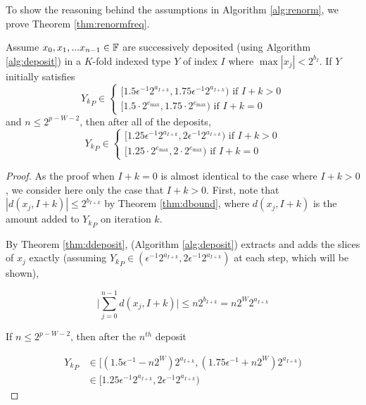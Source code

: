     To show the reasoning behind the assumptions in Algorithm \ref{alg:renorm},
    we prove Theorem \ref{thm:renormfreq}.

      \begin{samepage}
    \begin{thm}
      Assume $x_0, x_1, ... x_{n - 1} \in \mathbb{F}$ are successively deposited (using Algorithm \ref{alg:deposit}) in a $K$-fold indexed type $Y$ of index $I$ where $\max|x_j| < 2^{b_I}$. If $Y$ initially satisfies
       \[
      {Y_k}_P \in \begin{cases}[1.5  \epsilon^{-1} 2^{a_{I + k}}, 1.75  \epsilon^{-1} 2^{a_{I + k}}) \text{ if } I + k > 0 \\ [1.5 \cdot 2^{e_{\max}}, 1.75 \cdot 2^{e_{\max}}) \text{ if } I + k = 0\end{cases}
      \]
       and $n \leq 2^{p - W - 2}$, then after all of the deposits, 
       \[
      {Y_k}_P \in \begin{cases}[1.25  \epsilon^{-1} 2^{a_{I + k}}, 2  \epsilon^{-1} 2^{a_{I + k}}) \text{ if } I + k > 0 \\ [1.25 \cdot 2^{e_{\max}}, 2 \cdot 2^{e_{\max}}) \text{ if } I + k = 0\end{cases}
      \]
      \label{thm:renormfreq}
    \end{thm}
    \end{samepage}

    \begin{proof}
    As the proof when $I + k = 0$ is almost identical to the case where $I + k > 0$, we consider here only the case that $I + k > 0$.
    First, note that $|d(x_j, I + k)| \leq 2^{b_{I + k}}$ by Theorem
    \ref{thm:dbound}, where $d(x_j, I + k)$ is the amount added to ${Y_k}_P$ on
    iteration $k$.

    By Theorem \ref{thm:ddeposit},  (Algorithm \ref{alg:deposit}) extracts and adds the slices of $x_j$ exactly (assuming ${Y_k}_P \in (\epsilon^{-1} 2^{a_{I + k}}, 2  \epsilon^{-1} 2^{a_{I + k}})$ at each step, which will be shown),

    \begin{equation*}
    \bigl|\sum \limits_{j = 0}^{n - 1} d(x_j, I + k)\bigr| \leq n  2^{b_{I + k}} = n  2^{W}  2^{a_{I + k}}
    \end{equation*}

    If $n \leq 2^{p - W - 2}$, then after the $n^{th}$ deposit

    \begin{align*}
    {Y_k}_P &\in \bigl[(1.5  \epsilon^{-1} - n  2^W) 2^{a_{I + k}}, (1.75  \epsilon^{-1} + n  2^W) 2^{a_{I + k}}\bigr) \\
    &\in [1.25  \epsilon^{-1} 2^{a_{I + k}}, 2  \epsilon^{-1} 2^{a_{I + k}})
    \end{align*}
    \end{proof}

